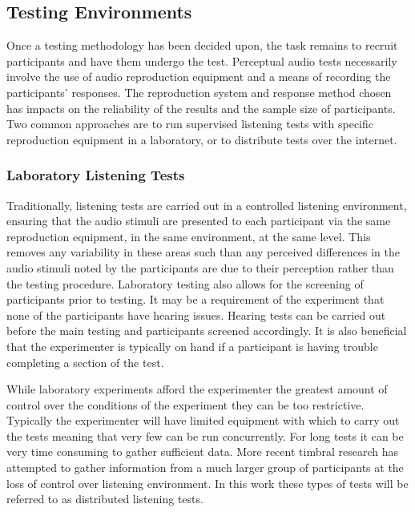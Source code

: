 	\subsection{Testing Environments}
	\label{sec:Timbre-ListeningTests-Environments}
		Once a testing methodology has been decided upon, the task remains to recruit participants and have them
		undergo the test. Perceptual audio tests necessarily involve the use of audio reproduction equipment and a
		means of recording the participants' responses. The reproduction system and response method chosen has
		impacts on the reliability of the results and the sample size of participants. Two common approaches are to
		run supervised listening tests with specific reproduction equipment in a laboratory, or to distribute tests
		over the internet.

		\subsubsection*{Laboratory Listening Tests}
			Traditionally, listening tests are carried out in a controlled listening environment, ensuring that
			the audio stimuli are presented to each participant via the same reproduction equipment, in the
			same environment, at the same level. This removes any variability in these areas such than any
			perceived differences in the audio stimuli noted by the participants are due to their perception
			rather than the testing procedure. Laboratory testing also allows for the screening of participants
			prior to testing. It may be a requirement of the experiment that none of the participants have
			hearing issues. Hearing tests can be carried out before the main testing and participants screened
			accordingly. It is also beneficial that the experimenter is typically on hand if a participant is
			having trouble completing a section of the test.

			While laboratory experiments afford the experimenter the greatest amount of control over the
			conditions of the experiment they can be too restrictive. Typically the experimenter will have
			limited equipment with which to carry out the tests meaning that very few can be run concurrently.
			For long tests it can be very time consuming to gather sufficient data. More recent timbral
			research has attempted to gather information from a much larger group of participants at the loss
			of control over listening environment. In this work these types of tests will be referred to as
			distributed listening tests.

